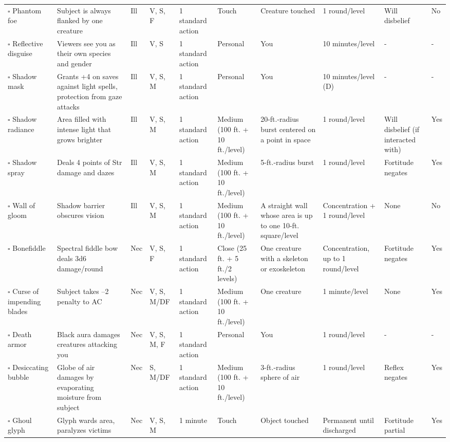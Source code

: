 \documentclass[12pt, a4paper]{article}
\begin{document}
\begin{center}
\begin{longtable}[H]{ p{8em} p{15em} p{2em} p{5em} p{6em} p{6em} p{10em} p{6em} p{5em} p{2em} }
    \(\square\) Phantom foe & Subject is always ﬂanked by one creature & Ill & V, S, F & 1 standard action & Touch & Creature touched & 1 round/level & Will disbelief & No\\
    \(\square\) Reflective disguise & Viewers see you as their own species and gender & Ill & V, S & 1 standard action & Personal & You & 10 minutes/level & - & -\\
    \(\square\) Shadow mask & Grants +4 on saves against light spells, protection from gaze attacks & Ill & V, S, M & 1 standard action & Personal & You & 10 minutes/level (D) & - & -\\
    \(\square\) Shadow radiance & Area ﬁlled with intense light that grows brighter & Ill & V, S, M & 1 standard action & Medium (100 ft. + 10 ft./level) & 20-ft.-radius burst centered on a point in space & 1 round/level & Will disbelief (if interacted with) & Yes\\
    \(\square\) Shadow spray & Deals 4 points of Str damage and dazes & Ill & V, S, M & 1 standard action & Medium (100 ft. + 10 ft./level) & 5-ft.-radius burst & 1 round/level & Fortitude negates & Yes\\
    \(\square\) Wall of gloom & Shadow barrier obscures vision & Ill & V, S, M & 1 standard action & Medium (100 ft. + 10 ft./level) & A straight wall whose area is up to one 10-ft. square/level & Concentration + 1 round/level & None & No\\
    \(\square\) Bonefiddle & Spectral fiddle bow deals 3d6 damage/round & Nec & V, S, F & 1 standard action & Close (25 ft. + 5 ft./2 levels) & One creature with a skeleton or exoskeleton & Concentration, up to 1 round/level & Fortitude negates & Yes\\
    \(\square\) Curse of impending blades & Subject takes –2 penalty to AC & Nec & V, S, M/DF & 1 standard action & Medium (100 ft. + 10 ft./level) & One creature & 1 minute/level & None & Yes\\
    \(\square\) Death armor & Black aura damages creatures attacking you & Nec & V, S, M, F & 1 standard action & Personal & You & 1 round/level & - & -\\
    \(\square\) Desiccating bubble & Globe of air damages by evaporating moisture from subject & Nec & S, M/DF & 1 standard action & Medium (100 ft. + 10 ft./level) & 3-ft.-radius sphere of air & 1 round/level & Reﬂex negates & Yes\\
    \(\square\) Ghoul glyph & Glyph wards area, paralyzes victims & Nec & V, S, M & 1 minute & Touch & Object touched & Permanent until discharged & Fortitude partial & Yes\\

\end{longtable}
\end{center}
\end{document}
